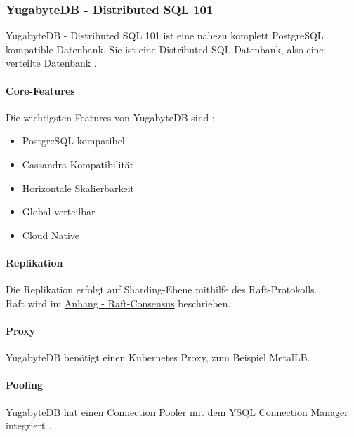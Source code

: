 
\clearpage
\begin{flushleft}
    \subsubsection{YugabyteDB - Distributed SQL 101}
    YugabyteDB - Distributed SQL 101 ist eine nahezu komplett \Gls{PostgreSQL} kompatible Datenbank.
    Sie ist eine Distributed SQL Datenbank, also eine verteilte Datenbank \cite{ZXD6D9KU}.
\end{flushleft}
\begin{flushleft}
    \paragraph{Core-Features}
    Die wichtigsten Features von YugabyteDB sind \cite{N6QKEPAC}:
    \begin{itemize}
        \item \Gls{PostgreSQL} kompatibel
        \item \Gls{Cassandra}-Kompatibilität
        \item Horizontale Skalierbarkeit
        \item Global verteilbar
        \item Cloud Native
    \end{itemize}
\end{flushleft}
\begin{flushleft}
    \paragraph{Replikation}
    Die Replikation erfolgt auf Sharding-Ebene mithilfe des Raft-Protokolls.\\
    Raft wird im \hyperref[subsec:mraft_consensus]{Anhang - Raft-Consensus} beschrieben.
\end{flushleft}
\begin{flushleft}
    \paragraph{Proxy}
    YugabyteDB benötigt einen \Gls{Kubernetes} Proxy, zum Beispiel \Gls{MetalLB}.
\end{flushleft}
\begin{flushleft}
    \paragraph{Pooling}
    YugabyteDB hat einen \Gls{Connection Pooler} mit dem YSQL Connection Manager integriert \cite{2FQ8JXD7}.
\end{flushleft}
